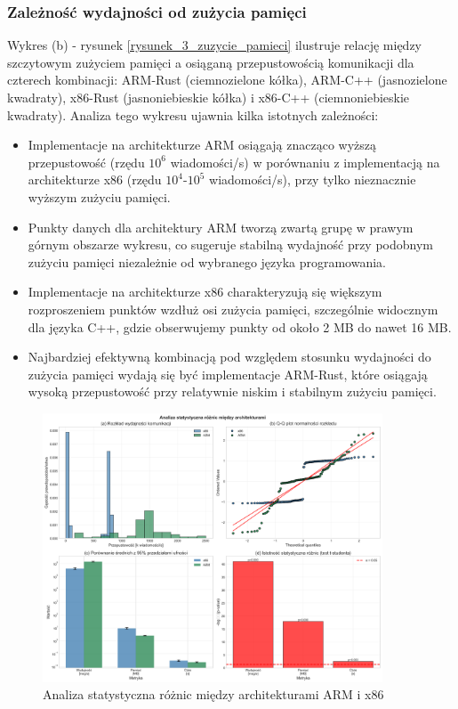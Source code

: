 \subsubsection{Zależność wydajności od zużycia pamięci}
Wykres (b) - rysunek \ref{rysunek_3_zuzycie_pamieci} ilustruje relację między szczytowym zużyciem pamięci a osiąganą przepustowością komunikacji dla czterech kombinacji: ARM-Rust (ciemnozielone kółka), ARM-C++ (jasnozielone kwadraty), x86-Rust (jasnoniebieskie kółka) i x86-C++ (ciemnoniebieskie kwadraty). Analiza tego wykresu ujawnia kilka istotnych zależności:
\begin{itemize}
    \item Implementacje na architekturze ARM osiągają znacząco wyższą przepustowość (rzędu $10^6$ wiadomości/s) w porównaniu z implementacją na architekturze x86 (rzędu $10^4$-$10^5$ wiadomości/s), przy tylko nieznacznie wyższym zużyciu pamięci.
    \item Punkty danych dla architektury ARM tworzą zwartą grupę w prawym górnym obszarze wykresu, co sugeruje stabilną wydajność przy podobnym zużyciu pamięci niezależnie od wybranego języka programowania.
    \item Implementacje na architekturze x86 charakteryzują się większym rozproszeniem punktów wzdłuż osi zużycia pamięci, szczególnie widocznym dla języka C++, gdzie obserwujemy punkty od około 2 MB do nawet 16 MB.
    \item Najbardziej efektywną kombinacją pod względem stosunku wydajności do zużycia pamięci wydają się być implementacje ARM-Rust, które osiągają wysoką przepustowość przy relatywnie niskim i stabilnym zużyciu pamięci.
\end{itemize}



\begin{figure}[H]
    \centering
    \includegraphics[width=0.9\textwidth]{analiza/images/conc/pc/compare/rysunek_4_analiza_statystyczna.png}
    \caption{Analiza statystyczna różnic między architekturami ARM i x86}
    \label{rysunek_4_analiza_statystyczna}
\end{figure}

